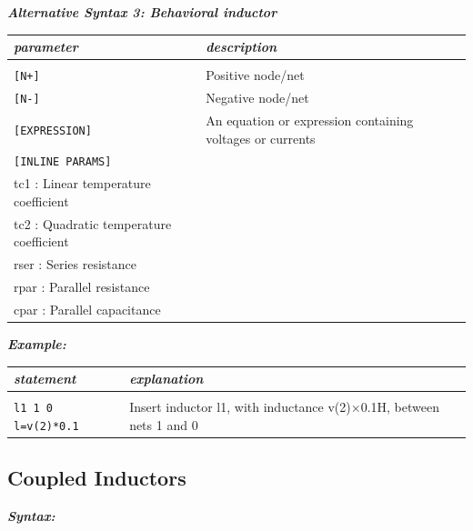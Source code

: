{\textbf{\textit{Alternative Syntax 3: Behavioral inductor}}


\begin{longtable}{l l}
\textit{parameter} & \textit{description} \\ \hline \\ \vspace{-0.8\parskip}
\texttt{[N+]} & Positive node/net \\
\texttt{[N-]} & Negative node/net \\
\texttt{[EXPRESSION]} & An equation or expression containing voltages or currents \\
\texttt{[INLINE PARAMS]} & \begin{tabular}{lp{5.5cm}p{5cm}}\textit{Inline parameters :} \\ 
																					{\small tc1 : Linear temperature coefficient} \\
																					{\small tc2 : Quadratic temperature coefficient} \\
																					{\small rser : Series resistance} \\
																					{\small rpar : Parallel resistance} \\
																					{\small cpar : Parallel capacitance} 
																					\end{tabular}  																	
\end{longtable}

\textbf{\textit{Example:}}

\begin{longtable}{l l}
\textit{statement} & \textit{explanation} \\ \hline \\ %
		\texttt{l1 1 0 l={v(2)*0.1}} 
			& {\small Insert inductor l1, with inductance v(2)$\times$0.1H, between nets 1 and 0} 
\end{longtable}
}


\newpage
\subsection{Coupled Inductors}
\label{subsec_sceadm_coupledinductors}

\textbf{\textit{Syntax:}}

